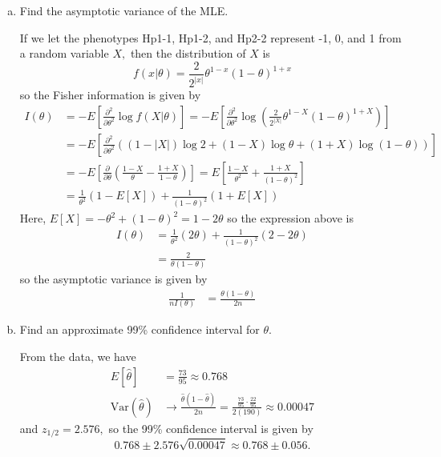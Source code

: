 \documentclass{article}
\newcommand{\var}{\mathrm{Var}}
\begin{document}
\begin{itemize}
\begin{enumerate}[a.]
			\item Find the asymptotic variance of the MLE.
				\begin{soln}
					If we let the phenotypes Hp1-1, Hp1-2, and Hp2-2 represent -1, 0, and 1 from a random variable $X,$ then the distribution of $X$ is \[f(x|\theta)=\frac{2}{2^{|x|}} \theta^{1-x}(1-\theta)^{1+x}\] so the Fisher information is given by 
					\begin{align*}
						I(\theta) &= -E\left[ \frac{\partial^2}{\partial\theta^2} \log f(X|\theta) \right] = -E\left[ \frac{\partial^2}{\partial\theta^2}\log\left( \frac{2}{2^{|X|}} \theta^{1-X}(1-\theta)^{1+X} \right) \right] \\
						&= -E\left[ \frac{\partial^2}{\partial\theta^2}\left( (1-|X|)\log 2 + (1-X)\log \theta + (1+X)\log (1-\theta) \right) \right] \\
						&= -E\left[ \frac{\partial}{\partial\theta}\left(\frac{1-X}{\theta}-\frac{1+X}{1-\theta}\right) \right] = E\left[ \frac{1-X}{\theta^2} + \frac{1+X}{(1-\theta)^2} \right] \\
						&= \frac{1}{\theta^2}\left( 1-E[X] \right) + \frac{1}{(1-\theta)^2}(1+E[X])
					\end{align*}
					Here, $E[X]=-\theta^2+(1-\theta)^2=1-2\theta$ so the expression above is
					\begin{align*}
						I(\theta) &= \frac{1}{\theta^2}(2\theta) + \frac{1}{(1-\theta)^2}(2-2\theta) \\
						&= \frac{2}{\theta(1-\theta)}
					\end{align*} so the asymptotic variance is given by 
					\begin{align*}
						\frac{1}{nI(\theta)} &= \frac{\theta(1-\theta)}{2n}
					\end{align*}
				\end{soln}

			\item Find an approximate 99\% confidence interval for $\theta.$
				\begin{soln}
					From the data, we have 
					\begin{align*}
						E[\hat{\theta}] &= \frac{73}{95}\approx 0.768 \\
						\var(\hat{\theta}) &\to \frac{\hat{\theta}(1-\hat{\theta})}{2n} = \frac{\frac{73}{95}\cdot\frac{22}{95}}{2(190)} \approx 0.00047
					\end{align*} and $z_{1/2}= 2.576,$ so the 99\% confidence interval is given by \[0.768\pm 2.576\sqrt{0.00047}\approx 0.768\pm 0.056.\]
				\end{soln}


\end{enumerate}
\end{itemize}
\end{document}
